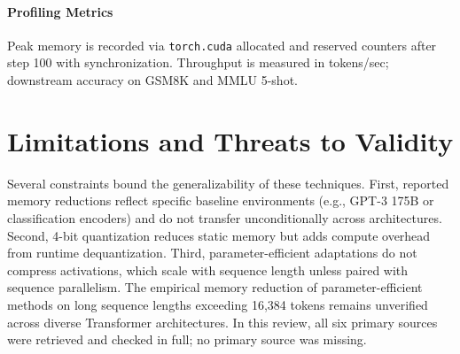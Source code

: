 \documentclass[11pt,a4paper]{article}
\begin{document}
\paragraph{Profiling Metrics}
Peak memory is recorded via \texttt{torch.cuda} allocated and reserved counters after step 100 with synchronization. Throughput is measured in tokens/sec; downstream accuracy on GSM8K and MMLU 5-shot.

\section{Limitations and Threats to Validity}
Several constraints bound the generalizability of these techniques. First, reported memory reductions reflect specific baseline environments (e.g., GPT-3 175B or classification encoders) and do not transfer unconditionally across architectures. Second, 4-bit quantization reduces static memory but adds compute overhead from runtime dequantization. Third, parameter-efficient adaptations do not compress activations, which scale with sequence length unless paired with sequence parallelism. The empirical memory reduction of parameter-efficient methods on long sequence lengths exceeding 16,384 tokens remains unverified across diverse Transformer architectures. In this review, all six primary sources were retrieved and checked in full; no primary source was missing.



\end{document}
